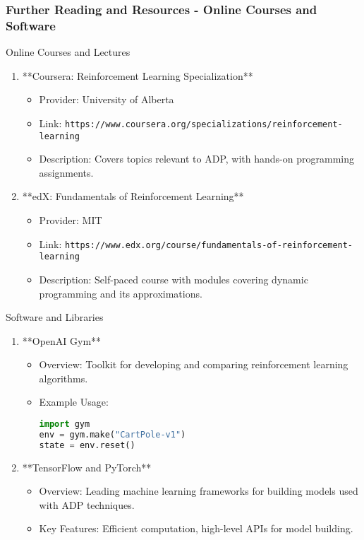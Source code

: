 \documentclass[aspectratio=169]{beamer}
\begin{document}
\begin{frame}[fragile]
    \frametitle{Further Reading and Resources - Online Courses and Software}
    \begin{block}{Online Courses and Lectures}
        \begin{enumerate}
            \item **Coursera: Reinforcement Learning Specialization**
                \begin{itemize}
                    \item Provider: University of Alberta
                    \item Link: \texttt{https://www.coursera.org/specializations/reinforcement-learning}
                    \item Description: Covers topics relevant to ADP, with hands-on programming assignments.
                \end{itemize}
            \item **edX: Fundamentals of Reinforcement Learning**
                \begin{itemize}
                    \item Provider: MIT
                    \item Link: \texttt{https://www.edx.org/course/fundamentals-of-reinforcement-learning}
                    \item Description: Self-paced course with modules covering dynamic programming and its approximations.
                \end{itemize}
        \end{enumerate}
    \end{block}

    \begin{block}{Software and Libraries}
        \begin{enumerate}
            \item **OpenAI Gym**
                \begin{itemize}
                    \item Overview: Toolkit for developing and comparing reinforcement learning algorithms.
                    \item Example Usage:
                    \begin{lstlisting}[language=python]
import gym
env = gym.make("CartPole-v1")
state = env.reset()
                    \end{lstlisting}
                \end{itemize}
            \item **TensorFlow and PyTorch**
                \begin{itemize}
                    \item Overview: Leading machine learning frameworks for building models used with ADP techniques.
                    \item Key Features: Efficient computation, high-level APIs for model building.
                \end{itemize}
        \end{enumerate}
    \end{block}
\end{frame}
\end{document}

